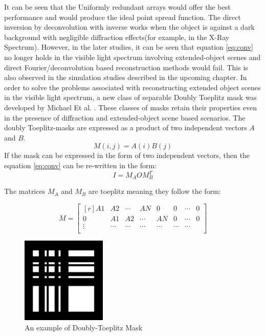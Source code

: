 It can be seen that the Uniformly redundant arrays would offer the best performance and would produce the ideal point spread function. The direct inversion by deconvolution with inverse works when the object is against a dark background with negligible diffraction effects(for example, in the X-Ray Spectrum). 
However, in the later studies\cite{Toeplitz}, it can be seen that equation \ref{eq:conv} no longer holds in the visible light spectrum involving extended-object scenes and direct Fourier/deconvolution based reconstruction methods would fail. This is also observed in the simulation studies described in the upcoming chapter. In order to solve the problems associated with reconstructing extended object scenes in the visible light spectrum, a new class of separable Doubly Toeplitz mask was developed by Michael Et al. \cite{Toeplitz}. These classes of masks retain their properties even in the presence of diffraction and extended-object scene based scenarios. The doubly Toeplitz-masks are expressed as a product of two independent vectors $A$ and $B$.
\begin{equation}
M(i,j) = A(i)B(j)
\end{equation}
If the mask can be expressed in the form of two independent vectors, then the equation \ref{eq:conv} can be re-written in the form: 
\begin{equation}
I = M_AOM_B^T
\label{eq:separable}
\end{equation}

The matrices $M_A$ and $M_B$ are toeplitz meaning they follow the form:

\[ %
 M = 
 \begin{bmatrix*}[r]
    A1 & A2 & \cdots &AN & 0 &0 & \cdots & 0 \\
    0 & A1 & A2 & \cdots &AN & 0 & \cdots & 0\\
    \vdots &\cdots &\cdots &\cdots &\cdots&\cdots&\cdots \\
  \end{bmatrix*}
\]

\begin{figure}[ht]
\centering
\includegraphics[scale = 0.50]{pics/doubly-topelitz}
\caption{An example of Doubly-Toeplitz Mask\cite{Toeplitz}}
\label{fig:doubly_toeplitz}
\end{figure}

